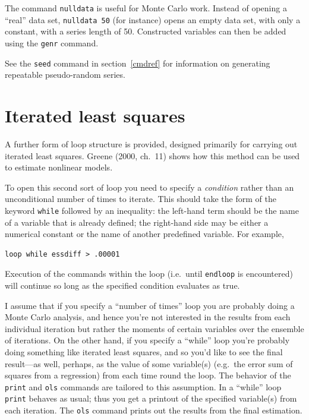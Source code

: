 \documentclass{article}
\begin{document}
The command \texttt{nulldata} is useful for Monte Carlo work.  Instead
of opening a ``real'' data set, \texttt{nulldata 50} (for instance)
opens an empty data set, with only a constant, with a series length of
50.  Constructed variables can then be added using the \texttt{genr}
command.  

See the \texttt{seed} command in section~\ref{cmdref} for information
on generating repeatable pseudo-random series.

\section{Iterated least squares}
\label{iterate}

A further form of loop structure is provided, designed primarily for
carrying out iterated least squares.  Greene (2000, ch.\ 11) shows how
this method can be used to estimate nonlinear models.

To open this second sort of loop you need to specify a
\textit{condition} rather than an unconditional number of times to
iterate.  This should take the form of the keyword \texttt{while}
followed by an inequality: the left-hand term should be the name of a
variable that is already defined; the right-hand side may be either a
numerical constant or the name of another predefined variable.  For
example, 

\begin{verbatim}
loop while essdiff > .00001
\end{verbatim}

Execution of the commands within the loop (i.e.\ until
\texttt{endloop} is encountered) will continue so long as the
specified condition evaluates as true.

I assume that if you specify a ``number of times'' loop you are
probably doing a Monte Carlo analysis, and hence you're not interested
in the results from each individual iteration but rather the moments
of certain variables over the ensemble of iterations.  On the other
hand, if you specify a ``while'' loop you're probably doing something
like iterated least squares, and so you'd like to see the final
result---as well, perhaps, as the value of some variable(s) (e.g.\ the
error sum of squares from a regression) from each time round the loop.
The behavior of the \texttt{print} and \texttt{ols} commands are
tailored to this assumption.  In a ``while'' loop \texttt{print} behaves
as usual; thus you get a printout of the specified variable(s) from
each iteration.  The \texttt{ols} command prints out the results from
the final estimation.  
\end{document}
